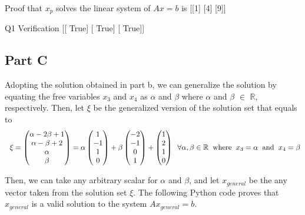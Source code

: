 \documentclass[12pt]{amsart}
\begin{document}
Proof that $x_p$ solves the linear system of $Ax = b$ is 
 [[1]
 [4]
 [9]] 

Q1 Verification 
 [[ True]
 [ True]
 [ True]]

\subsection{Part C}
Adopting the solution obtained in part b, we can generalize the solution by equating the free variables $x_3$  and $x_4$ as $\alpha$ and $\beta$  where $\alpha$ and $\beta$ $\in$ $\mathbb{R}$, respectively. Then, let $\xi$ be the generalized version of the solution set that equals to \\

\begin{equation*}
\hspace{2mm} \xi =
\begin{pmatrix}
 \alpha - 2\beta + 1\\ 
 \alpha - \beta + 2\\ 
 \alpha \\
 \beta
\end{pmatrix} = \alpha
\begin{pmatrix}
 1\\ 
 -1\\ 
 1 \\
 0
\end{pmatrix} + \beta 
\begin{pmatrix}
 -2\\ 
 -1\\ 
 0\\
 1
\end{pmatrix} + 
\begin{pmatrix}
 1\\ 
 2\\ 
 1 \\
 0
\end{pmatrix} \hspace{2mm} \forall \alpha, \beta \in \mathbb{R} \hspace{2mm} \text{where} \hspace{2mm} x_3 = \alpha \hspace{2mm}  \text{and}  \hspace{2mm} x_4 = \beta
\end{equation*}


Then, we can take any arbitrary scalar for $\alpha$ and $\beta$, and let $x_{general}$ be the any vector taken from the solution set $\xi$. The following Python code proves that $x_{general}$ is a valid solution to the system  $Ax_{general}  = b$.
\end{document}
